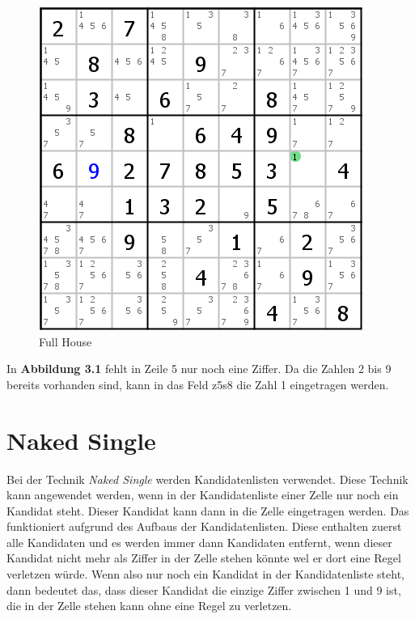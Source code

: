 \documentclass[accentcolor=tud6b,11pt,paper=a4]{tudreport}
\begin{document}
\begin{figure}[h]
\begin{center}
\includegraphics{./img/full_house.png}
\caption{Full House}
\end{center}
\end{figure}

In \textbf{Abbildung 3.1} fehlt in Zeile 5 nur noch eine Ziffer. Da die Zahlen 2 bis 9 bereits vorhanden sind, kann in das Feld z5s8 die Zahl 1 eingetragen werden.
\newpage
\section{Naked Single}
Bei der Technik \textit{Naked Single} werden Kandidatenlisten verwendet. Diese Technik kann angewendet werden, wenn in der Kandidatenliste einer Zelle nur noch ein Kandidat steht. Dieser Kandidat kann dann in die Zelle eingetragen werden. Das funktioniert aufgrund des Aufbaus der Kandidatenlisten. Diese enthalten zuerst alle Kandidaten und es werden immer dann Kandidaten entfernt, wenn dieser Kandidat nicht mehr als Ziffer in der Zelle stehen könnte wel er dort eine Regel verletzen würde. Wenn also nur noch ein Kandidat in der Kandidatenliste steht, dann bedeutet das, dass dieser Kandidat die einzige Ziffer zwischen 1 und 9 ist, die in der Zelle stehen kann ohne eine Regel zu verletzen.
\end{document}
